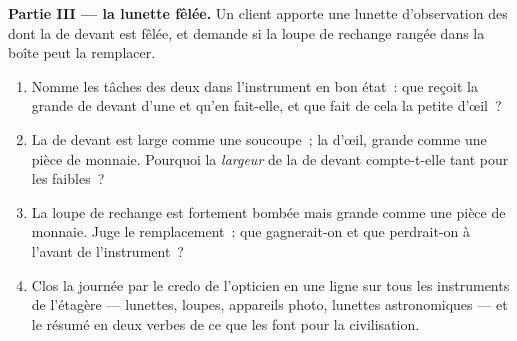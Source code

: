 \begin{problem}
\medskip\noindent\textbf{Partie III --- la lunette fêlée.}
Un client apporte une lunette d'observation des  dont la
 de devant est fêlée, et demande si la loupe de rechange
rangée dans la boîte peut la remplacer.
\begin{enumerate}[resume]
  \item Nomme les tâches des deux  dans l'instrument en bon
        état~: que reçoit la grande  de devant d'une 
        et qu'en fait-elle, et que fait de cela la petite 
        d'œil~?
  \item La  de devant est large comme une soucoupe~; la
         d'œil, grande comme une pièce de monnaie. Pourquoi
        la \emph{largeur} de la  de devant compte-t-elle
        tant pour les  faibles~?
  \item La loupe de rechange est fortement bombée mais grande comme
        une pièce de monnaie. Juge le remplacement~: que
        gagnerait-on et que perdrait-on à l'avant de l'instrument~?
  \item Clos la journée par le credo de l'opticien en une ligne sur
        tous les instruments de l'étagère --- lunettes, loupes,
        appareils photo, lunettes astronomiques --- et le résumé en
        deux verbes de ce que les  font pour la
        civilisation.
\end{enumerate}
\end{problem}
